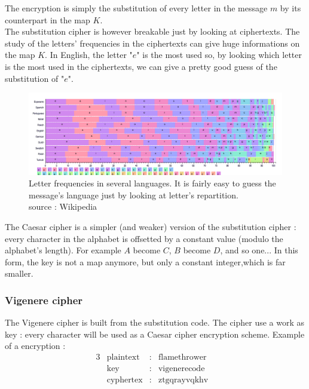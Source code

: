 The encryption is simply the substitution of every letter in the message $m$ by its counterpart in the map $K$.\\
The substitution cipher is however breakable just by looking at ciphertexts. The study of the letters' frequencies in the ciphertexts can give huge informations on the map $K$. In English, the letter "$e$" is the most used so, by looking which letter is the most used in the ciphertexts, we can give a pretty good guess of the substitution of "$e$".\\

\begin{figure}[ht!]
    \centering
		\includegraphics[width=\textwidth]{images/letter_frequency}
	\caption{Letter frequencies in several languages. It is fairly easy to guess the message's language just by looking at letter's repartition. \\ source : Wikipedia}
	\label{fig:LetterFrequency}
\end{figure}

The Caesar cipher is a simpler (and weaker) version of the substitution cipher : every character in the alphabet is offsetted by a constant value (modulo the alphabet's length). For example $A$ become $C$, $B$ become $D$, and so one... In this form, the key is not a map anymore, but only a constant integer,which is far smaller. 

%    


\subsubsection{ Vigenere cipher }

The  Vigenere cipher is built from the substitution code. The cipher use a work as key : every character will be used as a Caesar cipher encryption scheme. 
Example of a encryption : 
\begin{alignat*}{3}
    &\text{plaintext}   & : & \text{flamethrower}&  \\
    &\text{key}         & : & \text{vigenerecode}&  \\
    &\text{cyphertex}   & : & \text{ztgqrayvqkhv}&  \\ 
\end{alignat*}

